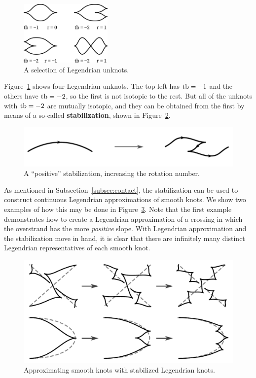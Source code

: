 \begin{figure}
    \centering
    \includegraphics[width=0.4\textwidth]{images/unknots.pdf}
    \caption{A selection of Legendrian unknots.}%
    \label{fig:unknots}
\end{figure}

Figure~\ref{fig:unknots} shows four Legendrian unknots. The top left has $\operatorname{tb} = -1$ and the others have $\operatorname{tb} = -2$, so the first is not isotopic to the rest. But all of the unknots with $\operatorname{tb} = -2$ are mutually isotopic, and they can be obtained from the first by means of a so-called \textbf{stabilization}, shown in Figure~\ref{fig:stabilization}.

\begin{figure}[ht]
    \centering
    \includegraphics[width=0.6\linewidth]{images/stabilization.pdf}
    \caption{A ``positive'' stabilization, increasing the rotation number.}%
    \label{fig:stabilization}
\end{figure}

As mentioned in Subsection~\ref{subsec:contact}, the stabilization can be used to construct continuous Legendrian approximations of smooth knots. We show two examples of how this may be done in Figure~\ref{fig:approximation}.
Note that the first example demonstrates how to create a Legendrian approximation of a crossing in which the overstrand has the more \emph{positive} slope.
With Legendrian approximation and the stabilization move in hand, it is clear that there are infinitely many distinct Legendrian representatives of each smooth knot.

\begin{figure}[ht]
    \centering
    \includegraphics[width=0.7\linewidth]{images/approximation.pdf}
    \caption{Approximating smooth knots with stabilized Legendrian knots.}
    \label{fig:approximation}
\end{figure}

